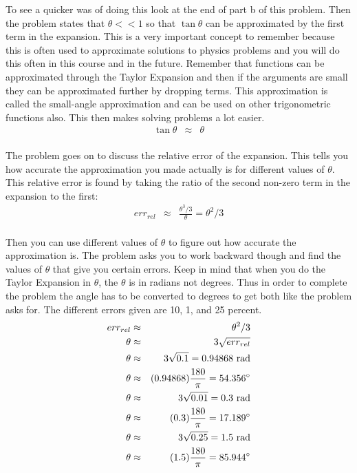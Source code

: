 \documentclass[11pt]{amsart}
\begin{document}
To see a quicker was of doing this look at the end of part b of this problem. Then the problem states that $\theta<<1$  so that $\tan{\theta}$ can be approximated by the first term in the expansion. This is a very important concept to remember because this is often used to approximate solutions to physics problems and you will do this often in this course and in the future. Remember that functions can be approximated through the Taylor Expansion and then if the arguments are small they can be approximated further by dropping terms. This approximation is called the small-angle approximation and can be used on other trigonometric functions also. This then makes solving problems a lot easier. \\
\begin{eqnarray*}
\tan{\theta} &\approx& \theta 
\end{eqnarray*} \\
The problem goes on to discuss the relative error of the expansion. This tells you how accurate the approximation you made actually is for different values of $\theta$. This relative error is found by taking the ratio of the second non-zero term in the expansion to the first: \\
\begin{eqnarray*} 
err_{rel} &\approx& \frac{\theta^{3}/3}{\theta}  = \theta^{2}/3 
\end{eqnarray*} \\
Then you can use different values of $\theta$ to figure out how accurate the approximation is. The problem asks you to work backward though and find the values of $\theta$ that give you certain errors. Keep in mind that when you do the Taylor Expansion in $\theta$, the $\theta$ is in radians not degrees. Thus in order to complete the problem the angle has to be converted to degrees to get both like the problem asks for. The different errors given are 10, 1, and 25 percent. \\
\begin{eqnarray*}
err_{rel} &\approx& \theta^{2}/3  \\
\theta &\approx& 3\sqrt{err_{rel}}  \\
\theta &\approx& 3\sqrt{0.1} = 0.94868 \mbox{ rad}  \\
\theta &\approx& (0.94868)\frac{180}{\pi} = 54.356\degree  \\
\theta &\approx& 3\sqrt{0.01} = 0.3 \mbox{ rad}  \\
\theta &\approx& (0.3)\frac{180}{\pi} = 17.189\degree  \\
\theta &\approx& 3\sqrt{0.25} = 1.5 \mbox{ rad}  \\
\theta &\approx& (1.5)\frac{180}{\pi} = 85.944\degree  
\end{eqnarray*} \\ 
\end{document}
